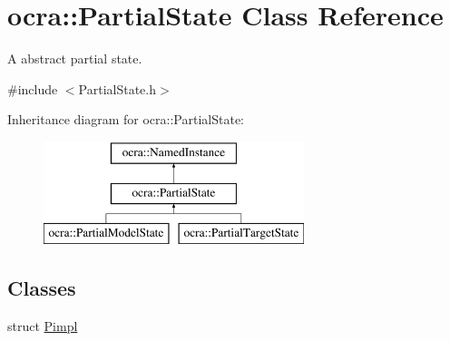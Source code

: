 \hypertarget{classocra_1_1PartialState}{}\section{ocra\+:\+:Partial\+State Class Reference}
\label{classocra_1_1PartialState}


A abstract partial state.  




{\ttfamily \#include $<$Partial\+State.\+h$>$}

Inheritance diagram for ocra\+:\+:Partial\+State\+:\begin{figure}[H]
\begin{center}
\leavevmode
\includegraphics[height=3.000000cm]{d0/d45/classocra_1_1PartialState}
\end{center}
\end{figure}
\subsection*{Classes}
\begin{DoxyCompactItemize}
\item 
struct \hyperlink{structocra_1_1PartialState_1_1Pimpl}{Pimpl}
\end{DoxyCompactItemize}
